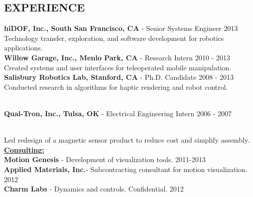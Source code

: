\documentclass[line,margin]{res}
\newcommand{\CVOnly}[1]{}
\newcommand{\CVOnly}[1]{#1}
\begin{document}
\begin{resume}
\section{EXPERIENCE} 
\vspace{1.0pc}
{\bf hiDOF, Inc., South San Francisco, CA} - Senior Systems Engineer \hfill 2013
\\[0.0pc]Technology transfer, exploration, and software development for robotics applications.
%
\\[0.4pc]{\bf Willow Garage, Inc., Menlo Park, CA} - Research Intern \hfill 2010 - 2013
\\[0.0pc]Created systems and user interfaces for teleoperated mobile manipulation.
%
\\[0.4pc]{\bf Salisbury Robotics Lab, Stanford, CA} - Ph.D. Candidate \hfill 2008 - 2013
\\[0.0pc]Conducted research in algorithms for haptic rendering and robot control.
\CVOnly{\\[0.0pc]Implemented miniature stereo camera sensor hardware for a robot gripper.}
%
\\[0.4pc]{\bf Qual-Tron, Inc., Tulsa, OK} - Electrical Engineering Intern \hfill 2006 - 2007
\CVOnly{\\[0.0pc] Designed and implemented test procedures for IR and magnetic sensor products. }
\\[0.0pc]Led redesign of a magnetic sensor product to reduce cost and simplify assembly.
%
\\[0.4pc]{\bf \underline{Consulting:}}
\\[0.2pc]{\bf Motion Genesis} - Development of visualization tools. \hfill 2011-2013
\\[0.0pc]{\bf Applied Materials, Inc.}- Subcontracting consultant for motion visualization. \hfill 2012
\\[0.0pc]{\bf Charm Labs} - Dynamics and controls. Confidential. \hfill 2012
%

%
%

\end{resume}
\end{document}
